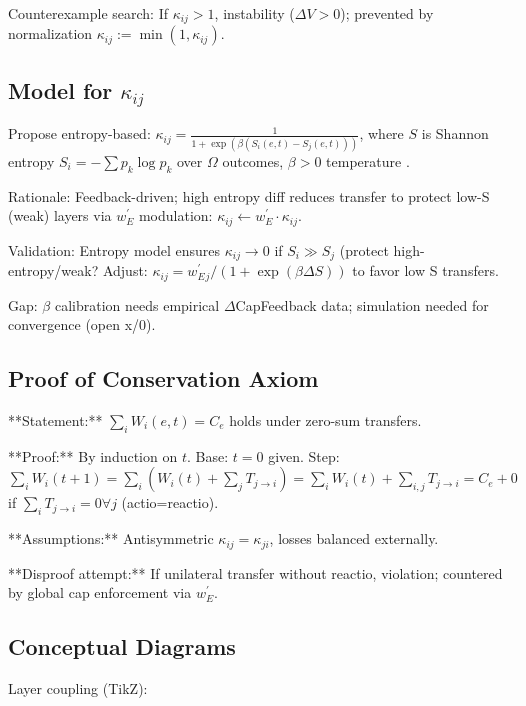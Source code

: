 \documentclass{article}
\begin{document}
Counterexample search: If $\kappa_{ij}>1$, instability ($\Delta V >0$); prevented by normalization $\kappa_{ij} := \min(1, \kappa_{ij})$.

\subsection{Model for $\kappa_{ij}$}

Propose entropy-based: $\kappa_{ij} = \frac{1}{1 + \exp(\beta (S_i(e,t) - S_j(e,t)))}$, where $S$ is Shannon entropy $S_i = -\sum p_k \log p_k$ over $\Omega$ outcomes, $\beta>0$ temperature \cite{proofs_2025}.

Rationale: Feedback-driven; high entropy diff reduces transfer to protect low-S (weak) layers via $w_E^\prime$ modulation: $\kappa_{ij} \leftarrow w_E^\prime \cdot \kappa_{ij}$.

Validation: Entropy model ensures $\kappa_{ij} \to 0$ if $S_i \gg S_j$ (protect high-entropy/weak? Adjust: $\kappa_{ij} = w_E^\prime_j / (1 + \exp(\beta \Delta S))$ to favor low S transfers.

Gap: $\beta$ calibration needs empirical $\Delta$CapFeedback data; simulation needed for convergence (open x/0).

\subsection{Proof of Conservation Axiom}

**Statement:** $\sum_i W_i(e,t) = C_e$ holds under zero-sum transfers.

**Proof:** By induction on $t$. Base: $t=0$ given. Step: $\sum_i W_i(t+1) = \sum_i (W_i(t) + \sum_j T_{j\to i}) = \sum_i W_i(t) + \sum_{i,j} T_{j\to i} = C_e + 0$ if $\sum_i T_{j\to i}=0 \forall j$ (actio=reactio).

**Assumptions:** Antisymmetric $\kappa_{ij} = \kappa_{ji}$, losses balanced externally.

**Disproof attempt:** If unilateral transfer without reactio, violation; countered by global cap enforcement via $w_E^\prime$.

\subsection{Conceptual Diagrams}

Layer coupling (TikZ):
\end{document}
